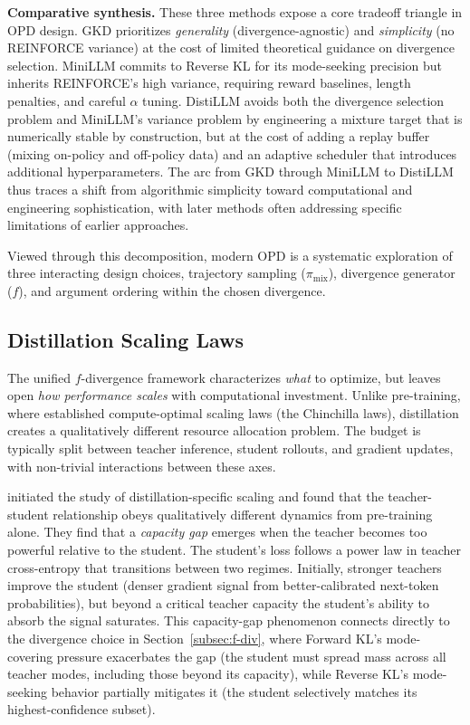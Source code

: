 \documentclass{article} %
\begin{document}
\textbf{Comparative synthesis.} These three methods expose a core tradeoff triangle in OPD design. GKD prioritizes \emph{generality} (divergence-agnostic) and \emph{simplicity} (no REINFORCE variance) at the cost of limited theoretical guidance on divergence selection. MiniLLM commits to Reverse KL for its mode-seeking precision but inherits REINFORCE's high variance, requiring reward baselines, length penalties, and careful $\alpha$ tuning. DistiLLM avoids both the divergence selection problem and MiniLLM's variance problem by engineering a mixture target that is numerically stable by construction, but at the cost of adding a replay buffer (mixing on-policy and off-policy data) and an adaptive scheduler that introduces additional hyperparameters. The arc from GKD through MiniLLM to DistiLLM thus traces a shift from algorithmic simplicity toward computational and engineering sophistication, with later methods often addressing specific limitations of earlier approaches.

Viewed through this decomposition, modern OPD is a systematic exploration of three interacting design choices, trajectory sampling ($\pi_{\mathrm{mix}}$), divergence generator ($f$), and argument ordering within the chosen divergence.

\subsection{Distillation Scaling Laws}
\label{subsec:scaling}

The unified $f$-divergence framework characterizes \emph{what} to optimize, but leaves open \emph{how performance scales} with computational investment. Unlike pre-training, where \citet{2203.15556} established compute-optimal scaling laws (the Chinchilla laws), distillation creates a qualitatively different resource allocation problem. The budget is typically split between teacher inference, student rollouts, and gradient updates, with non-trivial interactions between these axes.

\citet{2502.08606} initiated the study of distillation-specific scaling and found that the teacher-student relationship obeys qualitatively different dynamics from pre-training alone. They find that a \emph{capacity gap} emerges when the teacher becomes too powerful relative to the student. The student's loss follows a power law in teacher cross-entropy that transitions between two regimes. Initially, stronger teachers improve the student (denser gradient signal from better-calibrated next-token probabilities), but beyond a critical teacher capacity the student's ability to absorb the signal saturates. This capacity-gap phenomenon connects directly to the divergence choice in Section~\ref{subsec:f-div}, where Forward KL's mode-covering pressure exacerbates the gap (the student must spread mass across all teacher modes, including those beyond its capacity), while Reverse KL's mode-seeking behavior partially mitigates it (the student selectively matches its highest-confidence subset).
\end{document}
